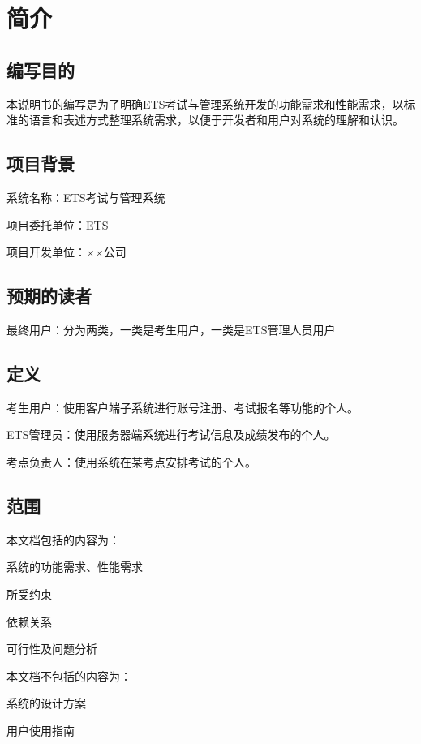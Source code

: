 \chapter{简介}

\section{编写目的}
本说明书的编写是为了明确ETS考试与管理系统开发的功能需求和性能需求，以标准的语言和表述方式整理系统需求，以便于开发者和用户对系统的理解和认识。

\section{项目背景}
系统名称：ETS考试与管理系统

项目委托单位：ETS

项目开发单位：××公司

\section{预期的读者}
最终用户：分为两类，一类是考生用户，一类是ETS管理人员用户

\section{定义}
考生用户：使用客户端子系统进行账号注册、考试报名等功能的个人。

ETS管理员：使用服务器端系统进行考试信息及成绩发布的个人。

考点负责人：使用系统在某考点安排考试的个人。

\section{范围}
本文档包括的内容为：

系统的功能需求、性能需求

所受约束

依赖关系

可行性及问题分析

本文档不包括的内容为：

系统的设计方案

用户使用指南
